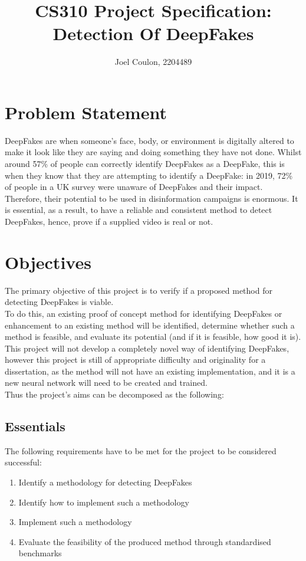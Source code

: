 \documentclass{article}
\title{CS310 Project Specification: Detection Of DeepFakes}
\author{Joel Coulon, 2204489}
\date{}
\begin{document}
\appendix

\section{Problem Statement}
DeepFakes are when someone's face, body, or environment is digitally altered to make it look like they are saying and doing something they have not done. Whilst around 57\% of people can correctly identify DeepFakes as a DeepFake\cite{human-detection}, this is when they know that they are attempting to identify a DeepFake: in 2019, 72\% of people in a UK survey were unaware of DeepFakes and their impact\cite{human-aware}. Therefore, their potential to be used in disinformation campaigns is enormous. It is essential, as a result, to have a reliable and consistent method to detect DeepFakes, hence, prove if a supplied video is real or not.


\section{Objectives}
The primary objective of this project is to verify if a proposed method for detecting DeepFakes is viable.\\

To do this, an existing proof of concept method for identifying DeepFakes or enhancement to an existing method will be identified, determine whether such a method is feasible, and evaluate its potential (and if it is feasible, how good it is). This project will not develop a completely novel way of identifying DeepFakes, however this project is still of appropriate difficulty and originality for a dissertation, as the method will not have an existing implementation, and it is a new neural network will need to be created and trained. \\

\noindent
Thus the project's aims can be decomposed as the following:

\subsection{Essentials}
The following requirements have to be met for the project to be considered successful:
\begin{enumerate}
    \item Identify a methodology for detecting DeepFakes
    \item Identify how to implement such a methodology
    \item Implement such a methodology
    \item Evaluate the feasibility of the produced method through standardised benchmarks
\end{enumerate}
\end{document}
